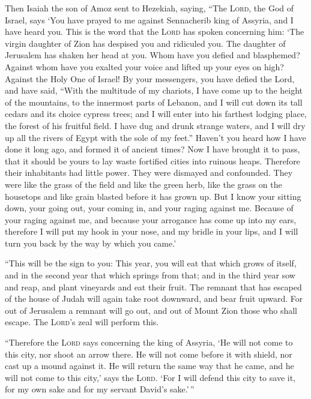  Then Isaiah the son of Amoz sent to Hezekiah, saying,
``The \textsc{Lord}, the God of Israel, says `You have prayed to me
against Sennacherib king of Assyria, and I have heard you.
 This is the word that the \textsc{Lord} has spoken
concerning him: `The virgin daughter of Zion has despised you and
ridiculed you. The daughter of Jerusalem has shaken her head at you.
 Whom have you defied and blasphemed? Against whom have
you exalted your voice and lifted up your eyes on high? Against the Holy
One of Israel!  By your messengers, you have defied the
Lord, and have said, ``With the multitude of my chariots, I have come up
to the height of the mountains, to the innermost parts of Lebanon, and I
will cut down its tall cedars and its choice cypress trees; and I will
enter into his farthest lodging place, the forest of his fruitful field.
 I have dug and drunk strange waters, and I will dry up
all the rivers of Egypt with the sole of my feet.'' 
Haven't you heard how I have done it long ago, and formed it of ancient
times? Now I have brought it to pass, that it should be yours to lay
waste fortified cities into ruinous heaps.  Therefore
their inhabitants had little power. They were dismayed and confounded.
They were like the grass of the field and like the green herb, like the
grass on the housetops and like grain blasted before it has grown up.
 But I know your sitting down, your going out, your
coming in, and your raging against me.  Because of your
raging against me, and because your arrogance has come up into my ears,
therefore I will put my hook in your nose, and my bridle in your lips,
and I will turn you back by the way by which you came.'

 ``This will be the sign to you: This year, you will eat
that which grows of itself, and in the second year that which springs
from that; and in the third year sow and reap, and plant vineyards and
eat their fruit.  The remnant that has escaped of the
house of Judah will again take root downward, and bear fruit upward.
 For out of Jerusalem a remnant will go out, and out of
Mount Zion those who shall escape. The \textsc{Lord}'s zeal will perform
this.

 ``Therefore the \textsc{Lord} says concerning the king
of Assyria, `He will not come to this city, nor shoot an arrow there. He
will not come before it with shield, nor cast up a mound against it.
 He will return the same way that he came, and he will
not come to this city,' says the \textsc{Lord}.  `For I
will defend this city to save it, for my own sake and for my servant
David's sake.'\,''

